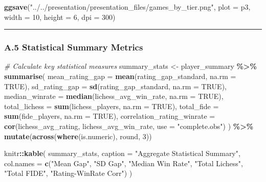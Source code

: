 \documentclass[
]{article}
\newenvironment{Shaded}{\begin{snugshade}}{\end{snugshade}}
\newcommand{\AttributeTok}[1]{\textcolor[rgb]{0.13,0.29,0.53}{#1}}
\newcommand{\CommentTok}[1]{\textcolor[rgb]{0.56,0.35,0.01}{\textit{#1}}}
\newcommand{\ConstantTok}[1]{\textcolor[rgb]{0.56,0.35,0.01}{#1}}
\newcommand{\DecValTok}[1]{\textcolor[rgb]{0.00,0.00,0.81}{#1}}
\newcommand{\FunctionTok}[1]{\textcolor[rgb]{0.13,0.29,0.53}{\textbf{#1}}}
\newcommand{\NormalTok}[1]{#1}
\newcommand{\OtherTok}[1]{\textcolor[rgb]{0.56,0.35,0.01}{#1}}
\newcommand{\SpecialCharTok}[1]{\textcolor[rgb]{0.81,0.36,0.00}{\textbf{#1}}}
\newcommand{\StringTok}[1]{\textcolor[rgb]{0.31,0.60,0.02}{#1}}
\begin{document}
\begin{Shaded}
\begin{Highlighting}[]
\FunctionTok{ggsave}\NormalTok{(}\StringTok{"../../presentation/presentation\_files/games\_by\_tier.png"}\NormalTok{, }\AttributeTok{plot =}\NormalTok{ p3, }\AttributeTok{width =} \DecValTok{10}\NormalTok{, }\AttributeTok{height =} \DecValTok{6}\NormalTok{, }\AttributeTok{dpi =} \DecValTok{300}\NormalTok{)}
\end{Highlighting}
\end{Shaded}

\begin{center}\rule{0.5\linewidth}{0.5pt}\end{center}

\subsubsection{A.5 Statistical Summary
Metrics}\label{a.5-statistical-summary-metrics}

\begin{Shaded}
\begin{Highlighting}[]
\CommentTok{\# Calculate key statistical measures}
\NormalTok{summary\_stats }\OtherTok{\textless{}{-}}\NormalTok{ player\_summary }\SpecialCharTok{\%\textgreater{}\%}
  \FunctionTok{summarise}\NormalTok{(}
    \AttributeTok{mean\_rating\_gap =} \FunctionTok{mean}\NormalTok{(rating\_gap\_standard, }\AttributeTok{na.rm =} \ConstantTok{TRUE}\NormalTok{),}
    \AttributeTok{sd\_rating\_gap =} \FunctionTok{sd}\NormalTok{(rating\_gap\_standard, }\AttributeTok{na.rm =} \ConstantTok{TRUE}\NormalTok{),}
    \AttributeTok{median\_winrate =} \FunctionTok{median}\NormalTok{(lichess\_avg\_win\_rate, }\AttributeTok{na.rm =} \ConstantTok{TRUE}\NormalTok{),}
    \AttributeTok{total\_lichess =} \FunctionTok{sum}\NormalTok{(lichess\_players, }\AttributeTok{na.rm =} \ConstantTok{TRUE}\NormalTok{),}
    \AttributeTok{total\_fide =} \FunctionTok{sum}\NormalTok{(fide\_players, }\AttributeTok{na.rm =} \ConstantTok{TRUE}\NormalTok{),}
    \AttributeTok{correlation\_rating\_winrate =} \FunctionTok{cor}\NormalTok{(lichess\_avg\_rating, lichess\_avg\_win\_rate, }
                                      \AttributeTok{use =} \StringTok{"complete.obs"}\NormalTok{)}
\NormalTok{  ) }\SpecialCharTok{\%\textgreater{}\%}
  \FunctionTok{mutate}\NormalTok{(}\FunctionTok{across}\NormalTok{(}\FunctionTok{where}\NormalTok{(is.numeric), round, }\DecValTok{3}\NormalTok{))}

\NormalTok{knitr}\SpecialCharTok{::}\FunctionTok{kable}\NormalTok{(}
\NormalTok{  summary\_stats,}
  \AttributeTok{caption =} \StringTok{"Aggregate Statistical Summary"}\NormalTok{,}
  \AttributeTok{col.names =} \FunctionTok{c}\NormalTok{(}\StringTok{"Mean Gap"}\NormalTok{, }\StringTok{"SD Gap"}\NormalTok{, }\StringTok{"Median Win Rate"}\NormalTok{, }
                \StringTok{"Total Lichess"}\NormalTok{, }\StringTok{"Total FIDE"}\NormalTok{, }\StringTok{"Rating{-}WinRate Corr"}\NormalTok{)}
\NormalTok{)}
\end{Highlighting}
\end{Shaded}
\end{document}
